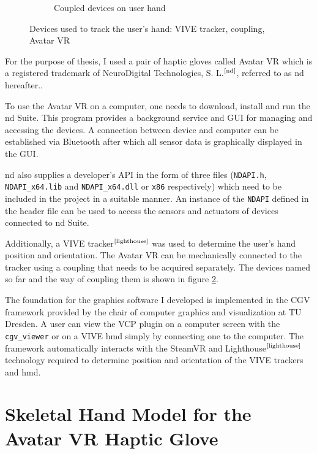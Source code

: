 \documentclass[hyperref, bachelorofscience]{cgvpub}
\newcommand{\newcite}[1]{$ ^{\text{\cite{#1}}} $}
\begin{document}
\begin{figure}[b!]
\begin{subfigure}{.49\linewidth}
		\caption{Coupled devices on user hand}
		\label{fig:devices:cou}
	\end{subfigure}
	\caption[Devices used to track the user's hand]{Devices used to track the user's hand: \Gls{VIVE} tracker, coupling, Avatar VR}
	\label{fig:devices}
\end{figure}

For the purpose of thesis, I used a pair of haptic gloves called Avatar VR which is a registered trademark of NeuroDigital Technologies, S. L.\newcite{nd}, referred to as \acrshort{nd} hereafter..

To use the Avatar VR on a computer, one needs to download, install and run the \acrshort{nd} Suite. This program provides a background service and GUI for managing and accessing the devices. A connection between device and computer can be established via Bluetooth after which all sensor data is graphically displayed in the GUI.

\acrshort{nd} also supplies a developer's API in the form of three files (\lstinline|NDAPI.h|, \lstinline|NDAPI_x64.lib| and \lstinline|NDAPI_x64.dll| or \lstinline|x86| respectively) which need to be included in the project in a suitable manner. An instance of the \lstinline|NDAPI| defined in the header file can be used to access the sensors and actuators of devices connected to \acrshort{nd} Suite.

Additionally, a \Gls{VIVE} tracker\newcite{lighthouse} was used to determine the user's hand position and orientation. The Avatar VR can be mechanically connected to the tracker using a coupling that needs to be acquired separately. The devices named so far and the way of coupling them is shown in figure \ref{fig:devices}.

The foundation for the graphics software I developed is implemented in the \gls{CGV} framework provided by the chair of computer graphics and visualization at TU Dresden. A user can view the \gls{VCP} plugin on a computer screen with the \lstinline|cgv_viewer| or on a \Gls{VIVE} \acrfull{hmd} simply by connecting one to the computer. The framework automatically interacts with the SteamVR and Lighthouse\newcite{lighthouse} technology required to determine position and orientation of the \Gls{VIVE} trackers and \acrshort{hmd}.

\section{Skeletal Hand Model for the Avatar VR Haptic Glove} \label{sec:hand_model}
\end{document}
